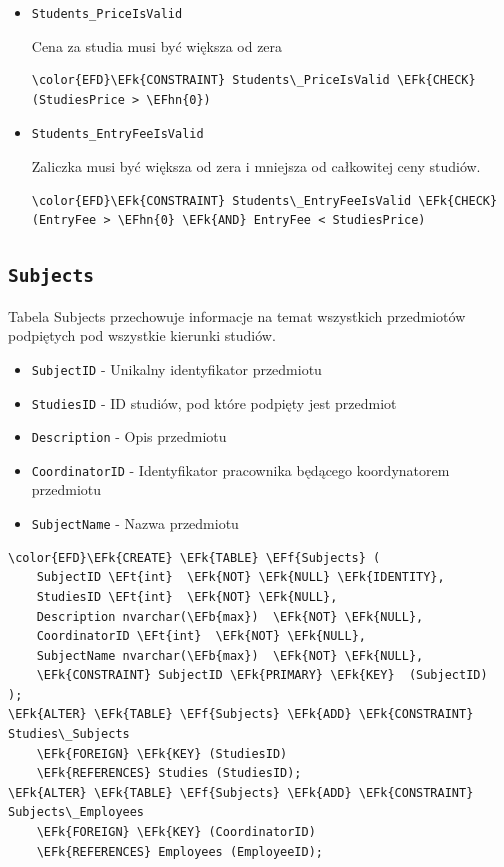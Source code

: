 \documentclass[11pt]{article}
\newcommand{\EFk}[1]{\textcolor{EFk}{\textbf{#1}}} %
\newcommand{\EFb}[1]{\textcolor{EFb}{\textbf{#1}}} %
\newcommand{\EFf}[1]{\textcolor{EFf}{#1}} %
\newcommand{\EFt}[1]{\textcolor{EFt}{\textbf{#1}}} %
\newcommand{\EFhn}[1]{\textcolor{EFhn}{#1}} %
\begin{document}
\begin{itemize}
\item \texttt{Students\_PriceIsValid}

Cena za studia musi być większa od zera
\begin{Code}
\begin{Verbatim}
\color{EFD}\EFk{CONSTRAINT} Students\_PriceIsValid \EFk{CHECK}
(StudiesPrice > \EFhn{0})
\end{Verbatim}
\end{Code}
\item \texttt{Students\_EntryFeeIsValid}

Zaliczka musi być większa od zera i mniejsza od całkowitej ceny studiów.
\begin{Code}
\begin{Verbatim}
\color{EFD}\EFk{CONSTRAINT} Students\_EntryFeeIsValid \EFk{CHECK}
(EntryFee > \EFhn{0} \EFk{AND} EntryFee < StudiesPrice)
\end{Verbatim}
\end{Code}
\end{itemize}
\subsection{\texttt{Subjects}}
\label{sec:orge782026}
Tabela Subjects przechowuje informacje na temat wszystkich przedmiotów podpiętych pod wszystkie kierunki studiów.
\begin{itemize}
\item \texttt{SubjectID} - Unikalny identyfikator przedmiotu
\item \texttt{StudiesID} - ID studiów, pod które podpięty jest przedmiot
\item \texttt{Description} - Opis przedmiotu
\item \texttt{CoordinatorID} - Identyfikator pracownika będącego koordynatorem przedmiotu
\item \texttt{SubjectName} - Nazwa przedmiotu
\end{itemize}
\begin{Code}
\begin{Verbatim}
\color{EFD}\EFk{CREATE} \EFk{TABLE} \EFf{Subjects} (
    SubjectID \EFt{int}  \EFk{NOT} \EFk{NULL} \EFk{IDENTITY},
    StudiesID \EFt{int}  \EFk{NOT} \EFk{NULL},
    Description nvarchar(\EFb{max})  \EFk{NOT} \EFk{NULL},
    CoordinatorID \EFt{int}  \EFk{NOT} \EFk{NULL},
    SubjectName nvarchar(\EFb{max})  \EFk{NOT} \EFk{NULL},
    \EFk{CONSTRAINT} SubjectID \EFk{PRIMARY} \EFk{KEY}  (SubjectID)
);
\EFk{ALTER} \EFk{TABLE} \EFf{Subjects} \EFk{ADD} \EFk{CONSTRAINT} Studies\_Subjects
    \EFk{FOREIGN} \EFk{KEY} (StudiesID)
    \EFk{REFERENCES} Studies (StudiesID);
\EFk{ALTER} \EFk{TABLE} \EFf{Subjects} \EFk{ADD} \EFk{CONSTRAINT} Subjects\_Employees
    \EFk{FOREIGN} \EFk{KEY} (CoordinatorID)
    \EFk{REFERENCES} Employees (EmployeeID);
\end{Verbatim}
\end{Code}
\end{document}
